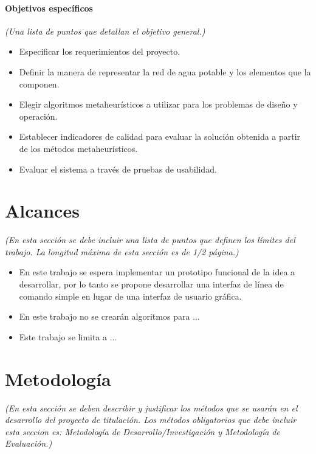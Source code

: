 \documentclass[11pt,letterpaper]{article}
\begin{document}
\paragraph{Objetivos específicos} \emph{(Una lista de puntos que detallan el objetivo general.)}
\begin{itemize}
\item Especificar los requerimientos del proyecto.
\item Definir la manera de representar la red de agua potable y los elementos que la componen.
\item Elegir algoritmos metaheurísticos a utilizar para los problemas de diseño y operación.
\item Establecer indicadores de calidad para evaluar la solución obtenida a partir de los métodos metaheurísticos.
\item Evaluar el sistema a través de pruebas de usabilidad.
\end{itemize}



\section{Alcances}
\emph{(En esta sección se debe incluir una lista de puntos que definen los límites del trabajo. La longitud máxima de esta sección es de 1/2 página.)}
\begin{itemize}
\item En este trabajo se espera implementar un prototipo funcional de la idea a desarrollar, por lo tanto se propone desarrollar una interfaz de línea de comando simple en lugar de una interfaz de usuario gráfica. 
\item En este trabajo no se crearán algoritmos para ... 
\item Este trabajo se limita a ...
\end{itemize}



\section{Metodología}
\emph{(En esta sección se deben describir y justificar los métodos que se usarán en el desarrollo del proyecto de titulación. Los métodos obligatorios que debe incluir esta seccion es: Metodología de Desarrollo/Investigación y Metodología de Evaluación.)}
\end{document}
